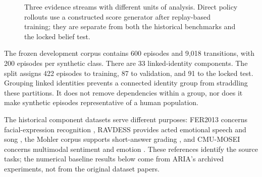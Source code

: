 \documentclass[10pt,a4paper]{article}
\begin{document}
\begin{figure}[htbp]
\centering
{}
\caption{Three evidence streams with different units of analysis. Direct policy rollouts use a constructed score generator after replay-based training; they are separate from both the historical benchmarks and the locked belief test.}
\label{fig:evidence}
\end{figure}

The frozen development corpus contains 600 episodes and 9,018 transitions, with 200 episodes per synthetic class. There are 33 linked-identity components. The split assigns 422 episodes to training, 87 to validation, and 91 to the locked test. Grouping linked identities prevents a connected identity group from straddling these partitions. It does not remove dependencies within a group, nor does it make synthetic episodes representative of a human population.

The historical component datasets serve different purposes: FER2013 concerns facial-expression recognition \cite{fer}, RAVDESS provides acted emotional speech and song \cite{ravdess}, the Mohler corpus supports short-answer grading \cite{mohler}, and CMU-MOSEI concerns multimodal sentiment and emotion \cite{mosei}. These references identify the source tasks; the numerical baseline results below come from ARIA's archived experiments, not from the original dataset papers.
\end{document}
